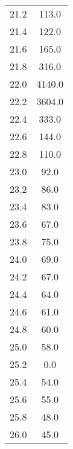 \begin{table}
\begin{tabular}{S S }
21.2  & 113.0\\ 
21.4  & 122.0\\ 
21.6  & 165.0\\ 
21.8  & 316.0\\ 
22.0  & 4140.0\\ 
22.2  & 3604.0\\ 
22.4  & 333.0\\ 
22.6  & 144.0\\ 
22.8  & 110.0\\ 
23.0  & 92.0\\ 
23.2  & 86.0\\ 
23.4  & 83.0\\ 
23.6  & 67.0\\ 
23.8  & 75.0\\ 
24.0  & 69.0\\ 
24.2  & 67.0\\ 
24.4  & 64.0\\ 
24.6  & 61.0\\ 
24.8  & 60.0\\ 
25.0  & 58.0\\ 
25.2  & 0.0\\ 
25.4  & 54.0\\ 
25.6  & 55.0\\ 
25.8  & 48.0\\ 
26.0  & 45.0\\ 
\bottomrule 
\end{tabular} 
\end{table}